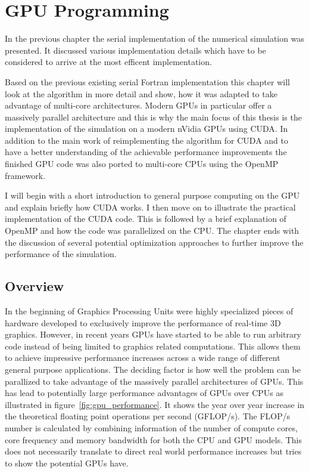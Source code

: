 \documentclass[a4paper,11pt]{kth-mag}
\begin{document}
\chapter{GPU Programming}
In the previous chapter the serial implementation of the numerical simulation was presented. It discussed various implementation details which have to be considered to arrive at the most efficent implementation.

Based on the previous existing serial Fortran implementation this chapter will look at the algorithm in more detail and show, how it was adapted to take advantage of multi-core architectures. Modern GPUs in particular offer a massively parallel architecture and this is why the main focus of this thesis is the implementation of the simulation on a modern nVidia GPUs using CUDA. In addition to the main work of reimplementing the algorithm for CUDA and to have a better understanding of the achievable performance improvements the finished GPU code was also ported to multi-core CPUs using the OpenMP framework.

I will begin with a short introduction to general purpose computing on the GPU and explain briefly how CUDA works. I then move on to illustrate the practical implementation of the CUDA code. This is followed by a brief explanation of OpenMP and how the code was parallelized on the CPU. The chapter ends with the discussion of several potential optimization approaches to further improve the performance of the simulation.

\section{Overview}
In the beginning of Graphics Processing Units were highly specialized pieces of hardware developed to exclusively improve the performance of real-time 3D graphics. However, in recent years GPUs have started to be able to run arbitrary code instead of being limited to graphics related computations. This allows them to achieve impressive performance increases across a wide range of different general purpose applications. The deciding factor is how well the problem can be parallized to take advantage of the massively parallel architectures of GPUs. This has lead to potentially large performance advantages of GPUs over CPUs as illustrated in figure~\ref{fig:gpu_performance}. It shows the year over year increase in the theoretical floating point operations per second (GFLOP/s). The FLOP/s number is calculated by combining information of the number of compute cores, core frequency and memory bandwidth for both the CPU and GPU models. This does not necessarily translate to direct real world performance increases but tries to show the potential GPUs have.
\end{document}
